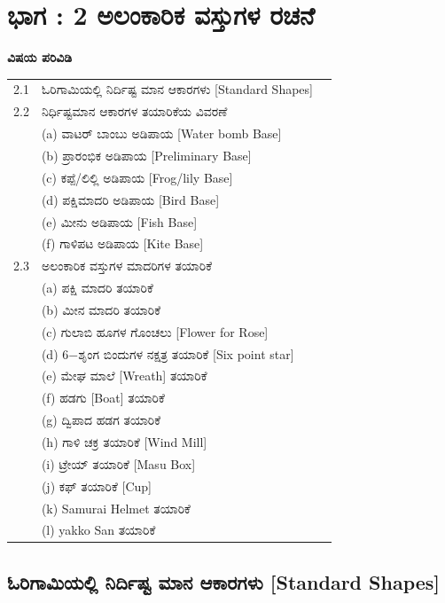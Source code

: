 \chapter{ಭಾಗ :  2 ಅಲಂಕಾರಿಕ ವಸ್ತುಗಳ ರಚನೆ}\label{chap2}

\textbf{\Large ವಿಷಯ ಪರಿವಿಡಿ}

\medskip
\medskip

{%
\begin{longtable}[l]{@{}>{}r>{\raggedright}p{9.1cm}>{}r@{}}
\hline
2.1 & ಓರಿಗಾಮಿಯಲ್ಲಿ ನಿರ್ದಿಷ್ಟ ಮಾನ ಆಕಾರಗಳು [Standard Shapes] \dotfill & \pageref{sec2.1}\\
2.2 & ನಿರ್ಧಿಷ್ಟಮಾನ ಆಕಾರಗಳ ತಯಾರಿಕೆಯ ವಿವರಣೆ \dotfill & {\pageref{sec2.2}}\\
& (a) ವಾಟರ್ ಬಾಂಬು ಅಡಿಪಾಯ [Water bomb Base] & \\
& (b) ಪ್ರಾರಂಭಿಕ ಅಡಿಪಾಯ [Preliminary Base] &\\
& (c) ಕಪ್ಪೆ/ಲಿಲ್ಲಿ ಅಡಿಪಾಯ [Frog/lily Base]&\\
& (d) ಪಕ್ಷಿಮಾದರಿ ಅಡಿಪಾಯ [Bird Base] & \\
& (e) ಮೀನು ಅಡಿಪಾಯ [Fish Base]  &\\
& (f) ಗಾಳಿಪಟ ಅಡಿಪಾಯ  [Kite Base]  & \\
2.3 & ಅಲಂಕಾರಿಕ ವಸ್ತುಗಳ ಮಾದರಿಗಳ ತಯಾರಿಕೆ \dotfill & \pageref{sec2.3}\\
& (a) ಪಕ್ಷಿ ಮಾದರಿ ತಯಾರಿಕೆ & \\
& (b) ಮೀನ ಮಾದರಿ ತಯಾರಿಕೆ  & \\
& (c) ಗುಲಾಬಿ ಹೂಗಳ ಗೊಂಚಲು [Flower for Rose] & \\
& (d) 6$-$ಶೃಂಗ ಬಿಂದುಗಳ ನಕ್ಷತ್ರ ತಯಾರಿಕೆ [Six point star] & \\
& (e) ಮೇಘ ಮಾಲೆ [Wreath] ತಯಾರಿಕೆ & \\
& (f)  ಹಡಗು [Boat] ತಯಾರಿಕೆ & \\
& (g) ದ್ವಿಪಾದ ಹಡಗ ತಯಾರಿಕೆ & \\
& (h) ಗಾಳಿ ಚಕ್ರ ತಯಾರಿಕೆ  [Wind Mill]& \\
& (i) ಟ್ರೇಯ್ ತಯಾರಿಕೆ [Masu Box]& \\
& (j) ಕಫ್ ತಯಾರಿಕೆ  [Cup]& \\
& (k) Samurai Helmet ತಯಾರಿಕೆ & \\
& (l) yakko San ತಯಾರಿಕೆ  & \\
\hline
\end{longtable}}\relax

\bigskip

 
 \section{ಓರಿಗಾಮಿಯಲ್ಲಿ ನಿರ್ದಿಷ್ಟ ಮಾನ ಆಕಾರಗಳು [Standard Shapes]}\label{sec2.1}%
 
